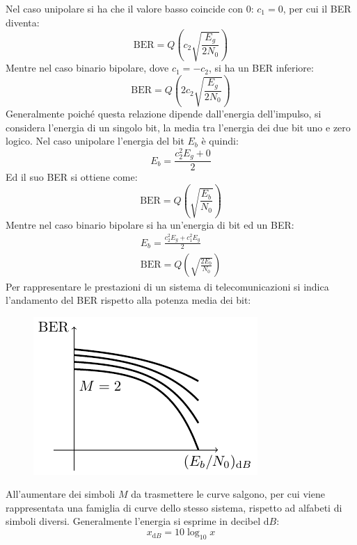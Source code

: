 \documentclass{article}
\newcommand{\df}{\mathrm{d}}
\numberwithin{equation}{subsection}
\begin{document}
Nel caso unipolare si ha che il valore basso coincide con $0$: $c_1=0$, per cui il BER diventa:
\begin{equation*}
    \mathrm{BER}=Q\left(\displaystyle c_2\sqrt{\frac{E_g}{2N_0}}\right)
\end{equation*}
Mentre nel caso binario bipolare, dove $c_1=-c_2$, si ha un BER inferiore:
\begin{equation*}
    \mathrm{BER}=Q\left(\displaystyle 2c_2\sqrt{\frac{E_g}{2N_0}}\right)
\end{equation*}
Generalmente poiché questa relazione dipende dall'energia dell'impulso, si considera l'energia di un singolo bit, la media tra l'energia dei due bit uno e zero logico. Nel caso 
unipolare l'energia del bit $E_b$ è quindi:
\begin{equation*}
    E_b=\displaystyle\frac{c_2^2E_g+0}{2}
\end{equation*}
Ed il suo BER si ottiene come:
\begin{equation*}
    \mathrm{BER}=Q\left(\displaystyle\sqrt{\frac{E_b}{N_0}}\right)
\end{equation*}
Mentre nel caso binario bipolare si ha un'energia di bit ed un BER:
\begin{gather*}
    E_b=\displaystyle\frac{c_2^2E_g+c_1^2E_g}{2}\\
    \mathrm{BER}=Q\left(\displaystyle\sqrt{\frac{2E_b}{N_0}}\right)
\end{gather*}
Per rappresentare le prestazioni di un sistema di telecomunicazioni si indica l'andamento del BER rispetto alla potenza media dei bit:
\begin{figure}[H]%
    \centering%
    \includegraphics{prestazioni.pdf}%
\end{figure}
All'aumentare dei simboli $M$ da trasmettere le curve salgono, per cui viene rappresentata una famiglia di curve dello stesso sistema, rispetto ad alfabeti di simboli diversi. 
Generalmente l'energia si esprime in decibel $\df B$:
\begin{equation*}
    x_{\df B}=10\log_{10}x
\end{equation*}
\end{document}
